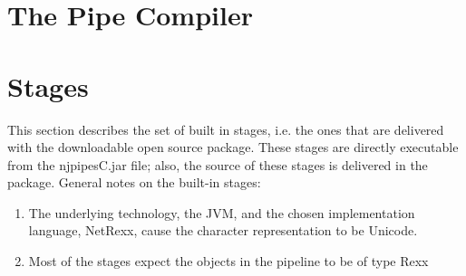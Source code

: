 \chapter{The Pipe Compiler}
\chapter{Stages}
This section describes the set of built in stages, i.e. the ones that are delivered with the downloadable open source package. These stages are directly executable from the njpipesC.jar file; also, the source of these stages is delivered in the package.
General notes on the built-in stages:
\begin{enumerate}
\item The underlying technology, the JVM, and the chosen implementation language, NetRexx, cause the character representation to be Unicode.
\item Most of the stages expect the objects in the pipeline to be of type Rexx
\end{enumerate}

\backmatter
\listoffigures
\listoftables
\lstlistoflistings
\printindex
\clearpage
 
